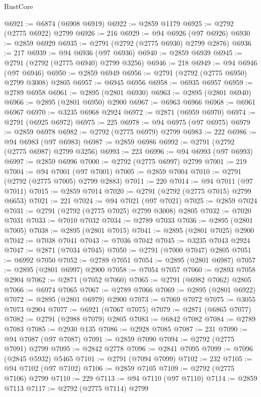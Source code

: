 \begin{lexlean}{RustCore}
\begin{coremodule}
@6921 := @6874 (@6908 @6919)
@6922 := @2859 @1179
@6925 := @2792 (@2775 @6922) @2799
@6926 := 216
@6929 := @94 @6926 (@97 @6926)
@6930 := @2859 @6929
@6935 := @2791 (@2792 (@2775 @6930) @2799 @2876)
@6936 := 217
@6939 := @94 @6936 (@97 @6936)
@6940 := @2859 @6939
@6945 := @2791 (@2792 (@2775 @6940) @2799 @3256)
@6946 := 218
@6949 := @94 @6946 (@97 @6946)
@6950 := @2859 @6949
@6956 := @2791 (@2792 (@2775 @6950) @2799 @3008) @2805
@6957 := @6945 @6956
@6958 := @6935 @6957
@6959 := @2789 @6958
@6961 := @2895 (@2801 @6930)
@6963 := @2895 (@2801 @6940)
@6966 := @2895 (@2801 @6950) @2900
@6967 := @6963 @6966
@6968 := @6961 @6967
@6970 := @3235 @6968 @2924
@6972 := @2871 (@6959 @6970)
@6974 := @2791 (@6925 @6972)
@6975 := 225
@6978 := @94 @6975 (@97 @6975)
@6979 := @2859 @6978
@6982 := @2792 (@2775 @6979) @2799
@6983 := 222
@6986 := @94 @6983 (@97 @6983)
@6987 := @2859 @6986
@6992 := @2791 (@2792 (@2775 @6987) @2799 @3256)
@6993 := 223
@6996 := @94 @6993 (@97 @6993)
@6997 := @2859 @6996
@7000 := @2792 (@2775 @6997) @2799
@7001 := 219
@7004 := @94 @7001 (@97 @7001)
@7005 := @2859 @7004
@7010 := @2791 (@2792 (@2775 @7005) @2799 @2883)
@7011 := 220
@7014 := @94 @7011 (@97 @7011)
@7015 := @2859 @7014
@7020 := @2791 (@2792 (@2775 @7015) @2799 @6653)
@7021 := 221
@7024 := @94 @7021 (@97 @7021)
@7025 := @2859 @7024
@7031 := @2791 (@2792 (@2775 @7025) @2799 @3008) @2805
@7032 := @7020 @7031
@7033 := @7010 @7032
@7034 := @2789 @7033
@7036 := @2895 (@2801 @7005)
@7038 := @2895 (@2801 @7015)
@7041 := @2895 (@2801 @7025) @2900
@7042 := @7038 @7041
@7043 := @7036 @7042
@7045 := @3235 @7043 @2924
@7047 := @2871 (@7034 @7045)
@7050 := @2791 (@7000 @7047) @2805
@7051 := @6992 @7050
@7052 := @2789 @7051
@7054 := @2895 (@2801 @6987)
@7057 := @2895 (@2801 @6997) @2900
@7058 := @7054 @7057
@7060 := @2893 @7058 @2904
@7062 := @2871 (@7052 @7060)
@7065 := @2791 (@6982 @7062) @2805
@7066 := @6974 @7065
@7067 := @2789 @7066
@7069 := @2895 (@2801 @6922)
@7072 := @2895 (@2801 @6979) @2900
@7073 := @7069 @7072
@7075 := @3055 @7073 @2904
@7077 := @6921 (@7067 @7075)
@7079 := @2871 (@6865 @7077)
@7082 := @2791 (@2988 @7079) @2805
@7083 := @6842 @7082
@7084 := @2789 @7083
@7085 := @2930 @135
@7086 := @2928 @7085
@7087 := 231
@7090 := @94 @7087 (@97 @7087)
@7091 := @2859 @7090
@7094 := @2792 (@2775 @7091) @2799
@7095 := @2842 @2778
@7096 := @2841 @7095
@7099 := @7096 (@2845 @5932) @5465
@7101 := @2791 (@7094 @7099)
@7102 := 232
@7105 := @94 @7102 (@97 @7102)
@7106 := @2859 @7105
@7109 := @2792 (@2775 @7106) @2799
@7110 := 229
@7113 := @94 @7110 (@97 @7110)
@7114 := @2859 @7113
@7117 := @2792 (@2775 @7114) @2799

\end{coremodule}
\end{lexlean}
